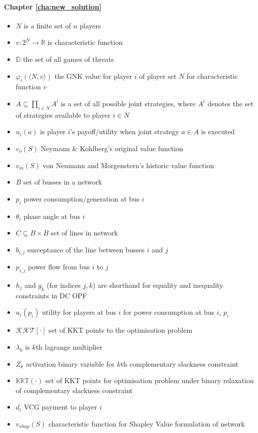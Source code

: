 \paragraph*{Chapter \ref{cha:new_solution}}
\begin{itemize}
\item	$N$ is a finite set of $n$ players
\item	$v:2^N\rightarrow \mathbb{R}$ is characteristic function
\item	$\mathbb{D}$ the set of all games of threats
\item	$\varphi_i(\langle N,v\rangle)$ the GNK value for player $i$ of player set $N$ for characteristic function $v$
\item	$A\subseteq \prod_{i\in N}A^i$ is a set of all possible joint strategies, where $A^i$ denotes the set of strategies available to player $i\in N$
\item	$u_i(a)$ is player $i$'s payoff/utility when joint strategy $a\in A$ is executed
\item	$v_o(S)$ Neymann \& Kohlberg's original value function
\item	$v_m(S)$ von Neumann and Morgenstern's historic value function
\item	$B$ set of busses in a network
\item	$p_i$ power consumption/generation at bus $i$
\item	$\theta_i$ phase angle at bus $i$
\item	$C\subseteq B\times B$ set of lines in network
\item	$b_{i,j}$ susceptance of the line between busses $i$ and $j$
\item	$p_{i,j}$ power flow from bus $i$ to $j$
\item	$h_j$ and $g_k$ (for indices $j,k$) are shorthand for equality and inequality constraints in DC OPF
\item	$u_i(p_i)$ utility for players at bus $i$ for power consumption at bus $i$, $p_i$
\item	$\mathcal{KKT}[\cdot]$ set of KKT points to the optimisation problem
\item	$\lambda_k$ is $k$th lagrange multiplier
\item	$Z_k$ activation binary variable for $k$th complementary slackness constraint
\item	$\mathbb{KKT}(\cdot)$ set of KKT points for optimisation problem under binary relaxation of complementary slackness constraint
\item	$d_i$ VCG payment to player $i$
\item	$v_{shap}(S)$ characteristic function for Shapley Value formulation of network 
\end{itemize}

